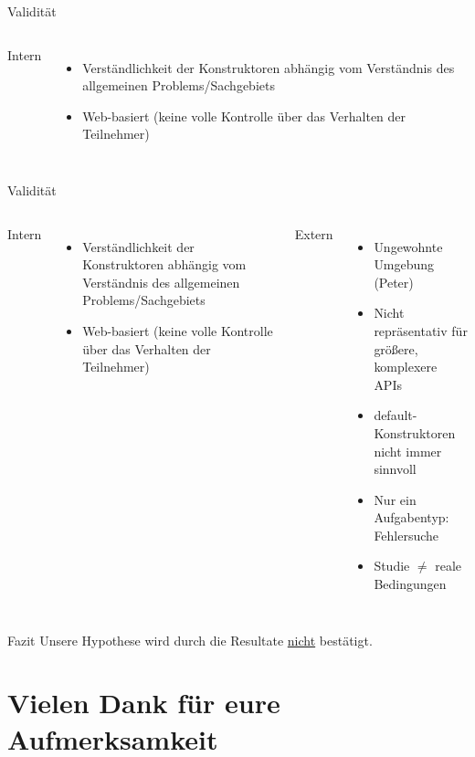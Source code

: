\documentclass[10pt]{beamer}
\begin{document}
	\begin{frame}{Validität}
		\begin{columns}[T,onlytextwidth]
	
			Intern
			\begin{itemize}
				\item Verständlichkeit der Konstruktoren abhängig vom Verständnis des allgemeinen Problems/Sachgebiets
				\item Web-basiert (keine volle Kontrolle über das Verhalten der Teilnehmer)
			\end{itemize}
			\vspace{19.3pt}
		
		\end{columns}	
	
	\end{frame}

	\begin{frame}{Validität}
		\begin{columns}[T,onlytextwidth]
	
			\column{0.5\textwidth}
			Intern
			\begin{itemize}
				\item Verständlichkeit der Konstruktoren abhängig vom Verständnis des allgemeinen Problems/Sachgebiets
				\item Web-basiert (keine volle Kontrolle über das Verhalten der Teilnehmer)
			\end{itemize}
		
			\column{0.5\textwidth}
			Extern
			\begin{itemize}
				\item Ungewohnte Umgebung (Peter)
				\item Nicht repräsentativ für größere, komplexere APIs
				\item default-Konstruktoren nicht immer sinnvoll
				\item Nur ein Aufgabentyp: Fehlersuche
				\item Studie $\neq$ reale Bedingungen
			\end{itemize}
		\end{columns}	
	
	\end{frame}
	
	\begin{frame}[standout]{Fazit}
		Unsere Hypothese wird durch die Resultate \underline{nicht} bestätigt.
	\end{frame}

\section{Vielen Dank für eure Aufmerksamkeit}
\end{document}

